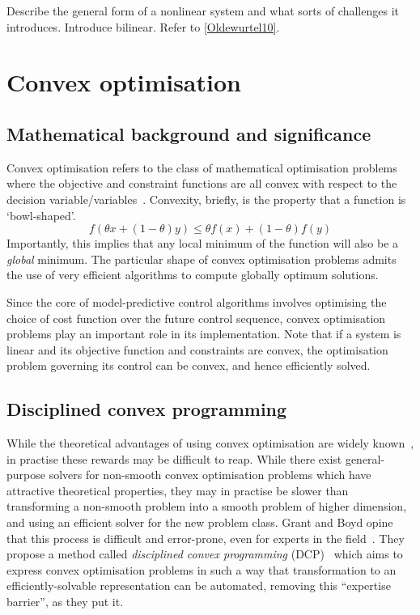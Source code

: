 Describe the general form of a nonlinear system and what sorts of challenges it introduces.
Introduce bilinear.
Refer to \ref{Oldewurtel10}.

\section{Convex optimisation}

\subsection{Mathematical background and significance}

Convex optimisation refers to the class of mathematical optimisation problems where the objective and constraint functions are all convex with respect to the decision variable/variables~\cite{Boyd04}.
Convexity, briefly, is the property that a function is `bowl-shaped'.
\begin{equation}
   f(\theta x + (1-\theta)y) \le \theta f(x) + (1-\theta) f(y)
\end{equation}
Importantly, this implies that any local minimum of the function will also be a \emph{global} minimum.
The particular shape of convex optimisation problems admits the use of very efficient algorithms to compute globally optimum solutions.

Since the core of model-predictive control algorithms involves optimising the choice of cost function over the future control sequence, convex optimisation problems play an important role in its implementation.
Note that if a system is linear and its objective function and constraints are convex, the optimisation problem governing its control can be convex, and hence efficiently solved.

\subsection{Disciplined convex programming}

While the theoretical advantages of using convex optimisation are widely known~\cite{Luo06}, in practise these rewards may be difficult to reap.
While there exist general-purpose solvers for non-smooth convex optimisation problems which have attractive theoretical properties, they may in practise be slower than transforming a non-smooth problem into a smooth problem of higher dimension, and using an efficient solver for the new problem class.
Grant and Boyd opine that this process is difficult and error-prone, even for experts in the field~\cite{Grant08}.
They propose a method called \emph{disciplined convex programming} (DCP)~\cite{Grant06} which aims to express convex optimisation problems in such a way that transformation to an efficiently-solvable representation can be automated, removing this ``expertise barrier'', as they put it.

